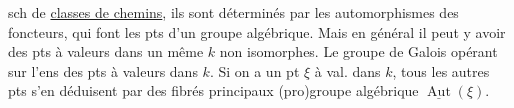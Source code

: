 sch de \uline{classes de chemins}, ils sont déterminés  par les automorphismes des foncteurs, qui font les pts d'un groupe algébrique.
Mais en général il peut y avoir des pts à valeurs dans un même $k$ non isomorphes.
Le groupe de Galois opérant sur  l'ens des pts à valeurs dans $k$.
Si on a un pt $\xi$ à val. dans $k$, tous les autres pts s'en déduisent par des fibrés principaux   (pro)groupe algébrique $\underline{\operatorname{Aut}}(\xi)$.


